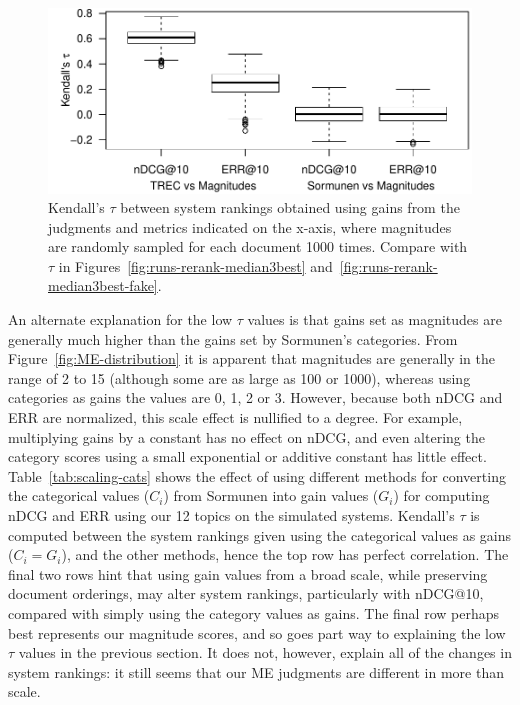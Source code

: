 \begin{figure}[tbp]
  \centering
  \includegraphics[width=.7\linewidth]{figs/metrics_resample.pdf}
  \caption{Kendall's $\tau$ between system rankings obtained using gains from 
    the judgments and metrics indicated on the x-axis, where magnitudes are randomly
    sampled for each document 1000 times. Compare with $\tau$ in
Figures~\ref{fig:runs-rerank-median3best} and~\ref{fig:runs-rerank-median3best-fake}.
  \label{fig:runs-rerank-resample}
  }
\end{figure}




An alternate explanation for the low $\tau$ values is that gains set as
magnitudes are generally much higher than the gains set by Sormunen's
categories.
From Figure~\ref{fig:ME-distribution} it is apparent that magnitudes
are generally in the range of 2 to 15 (although some are as large as
100 or 1000), whereas using categories as gains the values are 0, 1, 2
or 3. However, because both nDCG and ERR are normalized, this scale
effect is nullified to a degree.
For example, multiplying gains by a constant has no effect on nDCG, and
even altering the category scores using a small exponential or additive
constant has little effect.
Table~\ref{tab:scaling-cats} shows the effect of using different methods 
for converting the categorical values ($C_i$) from Sormunen into gain values
($G_i$) for computing nDCG and ERR
using our 12 topics on the simulated systems.
Kendall's $\tau$ is computed between the system rankings given using 
the categorical values as gains ($C_i=G_i$), and the other methods, 
hence the top row has perfect correlation.
The final two rows hint that using gain values from a broad scale,
while preserving document orderings, may alter system rankings,
particularly with nDCG@10, compared with simply using the category
values as gains.
The final row perhaps best represents our magnitude scores, and so goes
part way to explaining the low $\tau$ values in the previous section.
It does not, however, explain all of the changes in system rankings: 
it still seems that our ME judgments are different in more than scale. 


